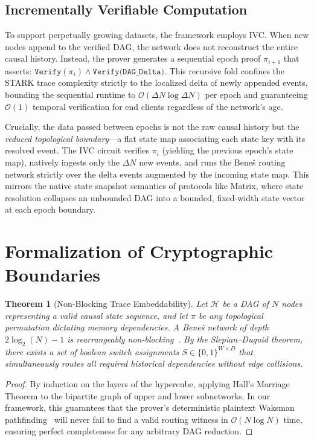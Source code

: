 \documentclass[11pt,a4paper]{article}
\newtheorem{theorem}{Theorem}[section]
\begin{document}
\subsection{Incrementally Verifiable Computation}

To support perpetually growing datasets, the framework employs IVC\@.
When new nodes append to the verified DAG, the network does not
reconstruct the entire causal history.  Instead, the prover
generates a sequential epoch proof $\pi_{i+1}$ that asserts:
$\texttt{Verify}(\pi_i) \wedge \texttt{Verify(DAG\_Delta)}$.  This
recursive fold confines the STARK trace complexity strictly to the
localized delta of newly appended events, bounding the sequential
runtime to $\mathcal{O}(\Delta N \log \Delta N)$ per epoch and
guaranteeing $\mathcal{O}(1)$ temporal verification for end clients
regardless of the network's age.

Crucially, the data passed between epochs is not the raw causal
history but the \emph{reduced topological boundary}---a flat state
map associating each state key with its resolved event.  The IVC
circuit verifies $\pi_i$ (yielding the previous epoch's state map),
natively ingests only the $\Delta N$ new events, and runs the
Bene\v{s} routing network strictly over the delta events augmented
by the incoming state map.  This mirrors the native state snapshot
semantics of protocols like Matrix, where state resolution
collapses an unbounded DAG into a bounded, fixed-width state vector
at each epoch boundary.


\section{Formalization of Cryptographic Boundaries}\label{sec:theory}

\begin{theorem}[Non-Blocking Trace Embeddability]\label{thm:embed}
Let $\mathcal{H}$ be a DAG of $N$ nodes representing a valid causal
state sequence, and let $\pi$ be any topological permutation
dictating memory dependencies.  A Bene\v{s} network of depth
$2\log_2(N) - 1$ is rearrangeably non-blocking~\cite{benes}.  By the
Slepian--Duguid theorem, there exists a set of boolean switch
assignments $S \in \{0,1\}^{W \times D}$ that simultaneously routes
all required historical dependencies without edge collisions.
\end{theorem}

\begin{proof}
By induction on the layers of the hypercube, applying Hall's
Marriage Theorem to the bipartite graph of upper and lower
subnetworks.  In our framework, this guarantees that the
prover's deterministic plaintext Waksman pathfinding~\cite{waksman} will never fail
to find a valid routing witness in $\mathcal{O}(N \log N)$ time,
ensuring perfect completeness for any arbitrary DAG reduction.
\end{proof}
\end{document}

